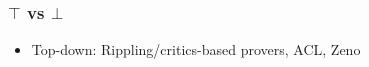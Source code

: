\documentclass[serif,professionalfont]{beamer}
\newcommand\dn[0]{\vspace{\baselineskip}}
\begin{document}
\begin{frame}
  \frametitle{$\top$ vs $\bot$}

    \begin{overprint}

    \begin{itemize}
      \item Top-down: Rippling/critics-based provers, ACL, Zeno
    \end{itemize}


    \rotateprop \rotatestep \stuck


     \tricky


    \tricky
    \dn
    \trickylemmas
    \end{overprint}

\end{frame}


\end{document}

